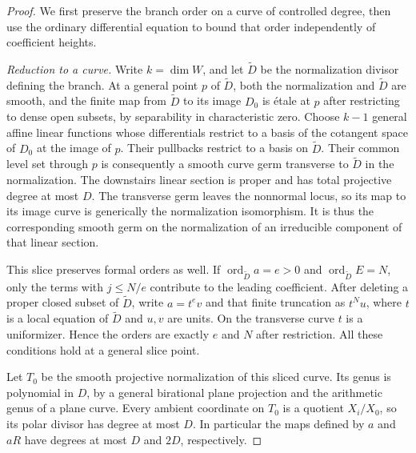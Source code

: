 \begin{proof}
We first preserve the branch order on a curve of controlled degree, then
use the ordinary differential equation to bound that order independently
of coefficient heights.

\emph{Reduction to a curve.}  Write $k=\dim W$, and
let $\widetilde D$ be the normalization divisor defining the branch.
At a general point $p$ of $\widetilde D$, both the normalization and
$\widetilde D$ are smooth, and the finite map from $\widetilde D$ to
its image $D_0$ is \'etale at $p$ after restricting to dense open
subsets, by separability in characteristic zero.  Choose $k-1$ general affine linear functions
whose differentials restrict to a basis of the cotangent space of
$D_0$ at the image of $p$.  Their pullbacks restrict to a basis on
$\widetilde D$.  Their common level set through $p$ is consequently
a smooth curve germ transverse to $\widetilde D$ in the normalization.
The downstairs linear section is proper and has total projective
degree at most $D$.  The transverse germ leaves the nonnormal locus,
so its map to its image curve is generically the normalization
isomorphism.  It is thus the corresponding smooth germ on the
normalization of an irreducible component of that linear section.

This slice preserves formal orders as well.  If
$\operatorname{ord}_{\widetilde D}a=e>0$ and
$\operatorname{ord}_{\widetilde D}E=N$, only the terms with $j\leq N/e$
contribute to the leading coefficient.  After deleting a proper closed
subset of $\widetilde D$, write $a=t^ev$ and that finite truncation as
$t^Nu$, where $t$ is a local equation of $\widetilde D$ and $u,v$ are
units.  On the transverse curve $t$ is a uniformizer.  Hence the
orders are exactly $e$ and $N$ after restriction.  All these conditions
hold at a general slice point.

Let $T_0$ be the smooth projective normalization of this sliced curve.
Its genus is polynomial in $D$, by a general birational plane
projection and the arithmetic genus of a plane curve.  Every ambient
coordinate on $T_0$ is a quotient $X_i/X_0$, so its polar divisor has
degree at most $D$.  In particular the maps defined by $a$ and $aR$
have degrees at most $D$ and $2D$, respectively.


\end{proof}
